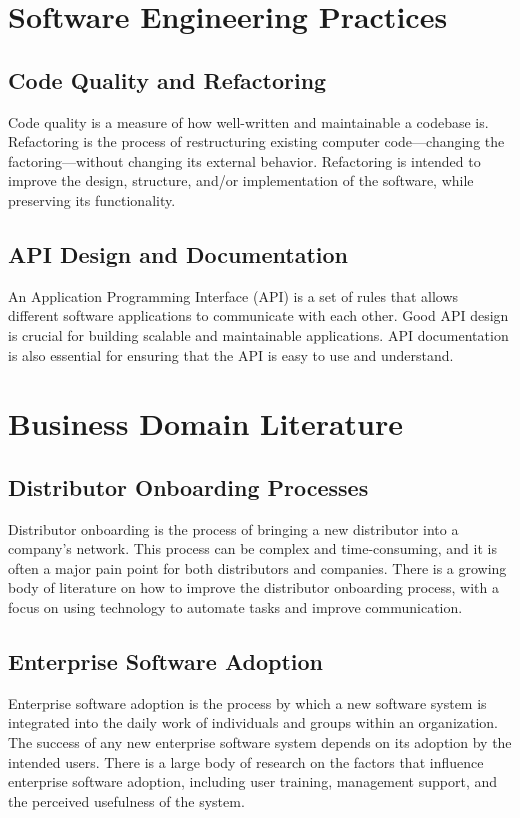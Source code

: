 \section{Software Engineering Practices}

\subsection{Code Quality and Refactoring}
Code quality is a measure of how well-written and maintainable a codebase is. Refactoring is the process of restructuring existing computer code—changing the factoring—without changing its external behavior. Refactoring is intended to improve the design, structure, and/or implementation of the software, while preserving its functionality.

\subsection{API Design and Documentation}
An Application Programming Interface (API) is a set of rules that allows different software applications to communicate with each other. Good API design is crucial for building scalable and maintainable applications. API documentation is also essential for ensuring that the API is easy to use and understand.

\section{Business Domain Literature}

\subsection{Distributor Onboarding Processes}
Distributor onboarding is the process of bringing a new distributor into a company's network. This process can be complex and time-consuming, and it is often a major pain point for both distributors and companies. There is a growing body of literature on how to improve the distributor onboarding process, with a focus on using technology to automate tasks and improve communication.

\subsection{Enterprise Software Adoption}
Enterprise software adoption is the process by which a new software system is integrated into the daily work of individuals and groups within an organization. The success of any new enterprise software system depends on its adoption by the intended users. There is a large body of research on the factors that influence enterprise software adoption, including user training, management support, and the perceived usefulness of the system.

